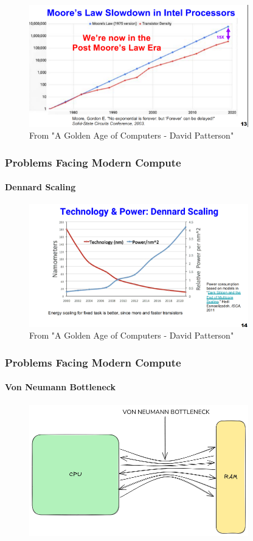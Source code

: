 \documentclass{beamer}
\begin{document}
{\begin{frame}[fragile]
  \begin{figure}
    \centering
    \includegraphics[width=0.85\textwidth]{images/mooreslaw.png}
    \caption{From "A Golden Age of Computers - David Patterson"
    \cite{patterson19}}
  \end{figure}

\end{frame}

\begin{frame}[fragile]
\frametitle{Problems Facing Modern Compute}
  \framesubtitle{Dennard Scaling}

  \begin{figure}
    \centering
    \includegraphics[width=0.85\textwidth]{images/dennardscaling.png}
    \caption{From "A Golden Age of Computers - David Patterson"}
  \end{figure}
\end{frame}

\begin{frame}[fragile]
\frametitle{Problems Facing Modern Compute}
  \framesubtitle{Von Neumann Bottleneck}

  \begin{figure}
    \centering
    \includegraphics[width=0.85\textwidth]{images/vonneumann.png}
  \end{figure}
\end{frame}

}
\end{document}
